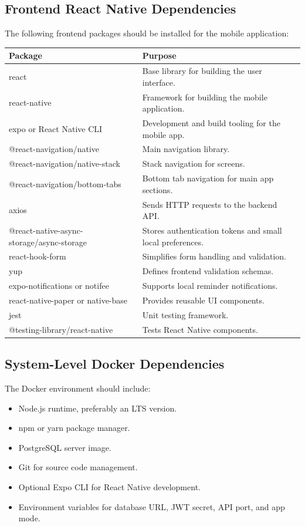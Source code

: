 \documentclass[12pt]{article}
\begin{document}
\subsection{Frontend React Native Dependencies}
The following frontend packages should be installed for the mobile application:
\begin{longtable}{|p{}|p{}|}
\hline
\textbf{Package} & \textbf{Purpose} \\
\hline
react & Base library for building the user interface. \\
\hline
react-native & Framework for building the mobile application. \\
\hline
expo or React Native CLI & Development and build tooling for the mobile app. \\
\hline
@react-navigation/native & Main navigation library. \\
\hline
@react-navigation/native-stack & Stack navigation for screens. \\
\hline
@react-navigation/bottom-tabs & Bottom tab navigation for main app sections. \\
\hline
axios & Sends HTTP requests to the backend API. \\
\hline
@react-native-async-storage/async-storage & Stores authentication tokens and small local preferences. \\
\hline
react-hook-form & Simplifies form handling and validation. \\
\hline
yup & Defines frontend validation schemas. \\
\hline
expo-notifications or notifee & Supports local reminder notifications. \\
\hline
react-native-paper or native-base & Provides reusable UI components. \\
\hline
jest & Unit testing framework. \\
\hline
@testing-library/react-native & Tests React Native components. \\
\hline
\end{longtable}

\subsection{System-Level Docker Dependencies}
The Docker environment should include:
\begin{itemize}[leftmargin=*]
    \item Node.js runtime, preferably an LTS version.
    \item npm or yarn package manager.
    \item PostgreSQL server image.
    \item Git for source code management.
    \item Optional Expo CLI for React Native development.
    \item Environment variables for database URL, JWT secret, API port, and app mode.
\end{itemize}
\end{document}
